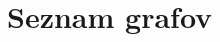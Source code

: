 \documentclass[11pt,paper=b5,footinclude,headinclude]{scrbook} %
\def\sledi {{~\Rightarrow~}}
\begin{document}
%
%
%
%
%
%
%
%
%
%
%
%
%
%
\appendix

\chapter{Seznam grafov}
\end{document}
